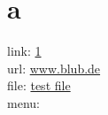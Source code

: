 \documentclass{article}
\begin{document}
\section{a}\label{a}
link: \ref{a} \\
url:  \url{www.blub.de}\\
file: \href{test-pdfresources.pdf}{test file}\\
menu: 
\end{document}
